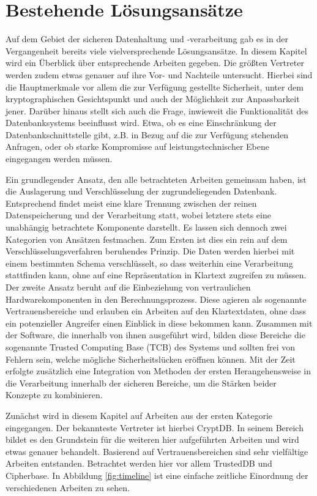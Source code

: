 \section{Bestehende Lösungsansätze}
Auf dem Gebiet der sicheren Datenhaltung und -verarbeitung gab es in der Vergangenheit bereits viele vielversprechende Lösungsansätze. In diesem Kapitel wird ein Überblick über entsprechende Arbeiten gegeben. Die größten Vertreter werden zudem etwas genauer auf ihre Vor- und Nachteile untersucht. Hierbei sind die Hauptmerkmale vor allem die zur Verfügung gestellte Sicherheit, unter dem kryptographischen Gesichtspunkt und auch der Möglichkeit zur Anpassbarkeit jener. Darüber hinaus stellt sich auch die Frage, inwieweit die Funktionalität des Datenbanksystems beeinflusst wird. Etwa, ob es eine Einschränkung der Datenbankschnittstelle gibt, z.B. in Bezug auf die zur Verfügung stehenden Anfragen, oder ob starke Kompromisse auf leistungstechnischer Ebene eingegangen werden müssen.

Ein grundlegender Ansatz, den alle betrachteten Arbeiten gemeinsam haben, ist die Auslagerung und Verschlüsselung der zugrundeliegenden Datenbank. Entsprechend findet meist eine klare Trennung zwischen der reinen Datenspeicherung und der Verarbeitung statt, wobei letztere stets eine unabhängig betrachtete Komponente darstellt. Es lassen sich dennoch zwei Kategorien von Ansätzen festmachen. Zum Ersten ist dies ein rein auf dem Verschlüsselungsverfahren beruhendes Prinzip. Die Daten werden hierbei mit einem bestimmten Schema verschlüsselt, so dass weiterhin eine Verarbeitung stattfinden kann, ohne auf eine Repräsentation in Klartext zugreifen zu müssen. Der zweite Ansatz beruht auf die Einbeziehung von vertraulichen Hardwarekomponenten in den Berechnungsprozess. Diese agieren als sogenannte Vertrauensbereiche und erlauben ein Arbeiten auf den Klartextdaten, ohne dass ein potenzieller Angreifer einen Einblick in diese bekommen kann. Zusammen mit der Software, die innerhalb von ihnen ausgeführt wird, bilden diese Bereiche die sogenannte Trusted Computing Base (TCB) des Systems und sollten frei von Fehlern sein, welche mögliche Sicherheitslücken eröffnen können. Mit der Zeit erfolgte zusätzlich eine Integration von Methoden der ersten Herangehensweise in die Verarbeitung innerhalb der sicheren Bereiche, um die Stärken beider Konzepte zu kombinieren.

Zunächst wird in diesem Kapitel auf Arbeiten aus der ersten Kategorie eingegangen. Der bekannteste Vertreter ist hierbei CryptDB. In seinem Bereich bildet es den Grundstein für die weiteren hier aufgeführten Arbeiten und wird etwas genauer behandelt. Basierend auf Vertrauensbereichen sind sehr vielfältige Arbeiten entstanden. Betrachtet werden hier vor allem TrustedDB und Cipherbase. In Abbildung \ref{fig:timeline} ist eine einfache zeitliche Einordnung der verschiedenen Arbeiten zu sehen.

